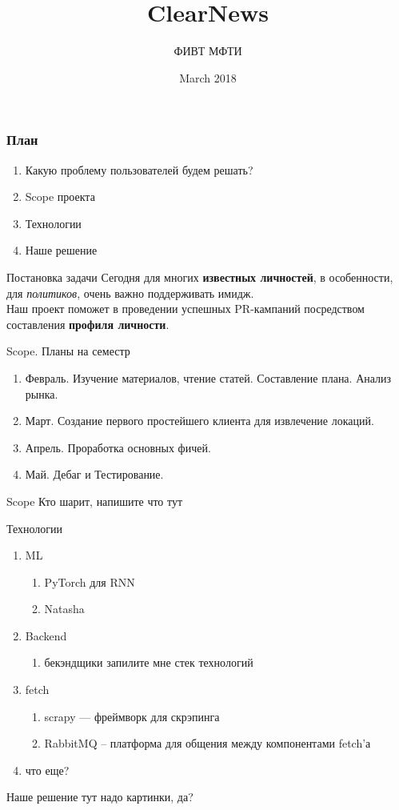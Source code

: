 \documentclass[10pt,pdf,hyperref={unicode}]{beamer}
\title{ClearNews}
\author{ФИВТ МФТИ}
\date{March 2018}
\begin{document}
\maketitle
\begin{frame}\frametitle{План}
\begin{enumerate}
    \item Какую проблему пользователей будем решать?
    \item Scope проекта
    \item Технологии
    \item Наше решение
\end{enumerate}
\end{frame}
\begin{frame}{Постановка задачи}
Сегодня для многих \textbf{известных личностей}, в особенности, для \textit{политиков}, очень важно поддерживать имидж. \\Наш проект поможет в проведении успешных PR-кампаний посредством составления \textbf{профиля личности}.
\end{frame}
\begin{frame}{Scope. Планы на семестр}
    \begin{enumerate}
        \item Февраль. Изучение материалов, чтение статей. Составление плана. Анализ рынка.
        \item Март. Создание первого простейшего клиента для извлечение локаций.
        \item Апрель. Проработка основных фичей. 
        \item Май. Дебаг и Тестирование.
    \end{enumerate}
\end{frame}
\begin{frame}{Scope}
Кто шарит, напишите что тут
\end{frame}
\begin{frame}{Технологии}
\begin{enumerate}
    \item ML
    \begin{enumerate}
        \item PyTorch для RNN
        \item Natasha
    \end{enumerate}
    \item Backend
        \begin{enumerate}
            \item бекэндщики запилите мне стек технологий
        \end{enumerate}
    \item fetch
        \begin{enumerate}
            \item scrapy --- фреймворк для скрэпинга
            \item RabbitMQ -- платформа для общения между компонентами fetch'а
        \end{enumerate}
    \item что еще?
\end{enumerate}
\end{frame}
\begin{frame}{Наше решение}
тут надо картинки, да?
    
\end{frame}
\end{document}

